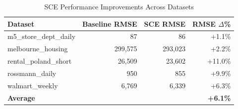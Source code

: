 \begin{table}[htbp]
\centering
\caption{SCE Performance Improvements Across Datasets}
\label{tab:results}
\begin{tabular}{lrrr}
\toprule
Dataset & Baseline RMSE & SCE RMSE & RMSE $\Delta$\% \\
\midrule
m5\_store\_dept\_daily & 87 & 86 & +1.1\% \\
melbourne\_housing & 299,575 & 293,023 & +2.2\% \\
rental\_poland\_short & 26,509 & 23,602 & +11.0\% \\
rossmann\_daily & 950 & 855 & +9.9\% \\
walmart\_weekly & 6,769 & 6,339 & +6.3\% \\
\midrule
\textbf{Average} & & & \textbf{+6.1\%} \\
\bottomrule
\end{tabular}
\end{table}